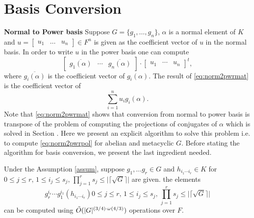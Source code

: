 \section{Basis Conversion}

\textbf{Normal to Power basis}
Suppose $G = \lbrace g_1, \ldots, g_n \rbrace$, $\alpha$ is a normal element of $K$ and $u = \begin{bmatrix}u_1 & \ldots & u_n \end{bmatrix} \in F^n$ is given as the coefficient vector of $u$ in the normal basis.
In order to write $u $ in the power basis one can compute 
\begin{equation}\label{eq:norm2pwrmat}
\left[\begin{array}{c|c|c}
\overline{g_1(\alpha)} & \cdots & \overline{g_n(\alpha)} 
\end{array}\right]\cdot 
\begin{bmatrix}
u_1 & \cdots & u_n
\end{bmatrix}^t,
\end{equation}
where $\overline{g_i(\alpha)}$ is the coefficient vector of $g_i(\alpha)$. The result of \eqref{eq:norm2pwrmat} is the coefficient vector of
\begin{equation}\label{eq:norm2pwrpol}
\sum_{i = 1}^n u_i g_i(\alpha).
\end{equation}
Note that \eqref{eq:norm2pwrmat} shows that conversion from normal to power basis is transpose of the problem of computing the projections of 
conjugates of $\alpha$ which is solved in Section \label{sec:osum}. Here we present an explicit algorithm to solve this problem i.e. to compute
\eqref{eq:norm2pwrpol} for abelian and metacyclic $G$. Before stating the algorithm for basis conversion, we present the last
ingredient needed. 

\begin{lemma}
Under the Assumption \ref{assum}, suppose $g_1, \ldots g_r \in G$ and $h_{i_1 \cdots i_r} \in K$ for $0 \leq j \leq r, \, 
1 \leq i_j \leq s_j, \, \prod_{j = 1}^r s_j \leq \vert \lceil \sqrt{G} \rceil \vert$ are given. the elements 
$$g_r^{i_r}\cdots g_1^{i_1}(h_{i_1 \cdots i_r}) 0 \leq j \leq r, \, 
1 \leq i_j \leq s_j, \, \prod_{j = 1}^r s_j \leq \vert \lceil \sqrt{G} \rceil \vert$$
can be computed using $\tilde{O}(\vert G \vert ^{(3/4)\cdot \omega(4/3)})$ operations over $F$.
\end{lemma}

